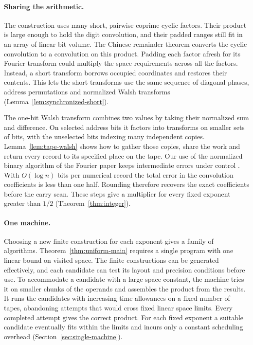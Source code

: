 \paragraph{Sharing the arithmetic.}
The construction uses many short, pairwise coprime cyclic factors.
Their product is large enough to hold the digit convolution, and
their padded ranges still fit in an array of linear bit volume.
The Chinese remainder theorem converts the cyclic convolution to a
convolution on this product. Padding each factor afresh for its
Fourier transform could multiply the space requirements across all the
factors. Instead, a short transform borrows occupied coordinates and
restores their contents. This lets the short transforms use the same
sequence of diagonal phases, address permutations and normalized
Walsh transforms (Lemma~\ref{lem:synchronized-short}).

The one-bit Walsh transform combines two values by taking their normalized
sum and difference. On selected address bits it factors into
transforms on smaller sets of bits, with the unselected bits indexing
many independent copies. Lemma~\ref{lem:tape-walsh} shows how to
gather those copies, share the work and return every record to its
specified place on the tape. Our use of the normalized binary
algorithm of the Fourier paper keeps intermediate errors under
control \cite[Proposition~]{oaF}.
With $O(\log n)$ bits per numerical record the total error in the
convolution coefficients is less than one half. Rounding therefore
recovers the exact coefficients before the carry scan. These steps
give a multiplier for every fixed exponent greater than $1/2$
(Theorem~\ref{thm:integer}).

\paragraph{One machine.}
Choosing a new finite construction for each exponent gives a family
of algorithms. Theorem~\ref{thm:uniform-main} requires a single
program with one linear bound on visited space. The finite
constructions can be generated effectively, and each candidate can
test its layout and precision conditions before use. To accommodate a
candidate with a large space constant, the machine tries it on smaller
chunks of the operands and assembles the product from the results.
It runs the candidates with increasing time allowances on a fixed
number of tapes, abandoning attempts that would cross fixed linear
space limits. Every completed attempt gives the correct product.
For each fixed exponent a suitable candidate eventually fits within
the limits and incurs only a constant scheduling overhead
(Section~\ref{sec:single-machine}).


